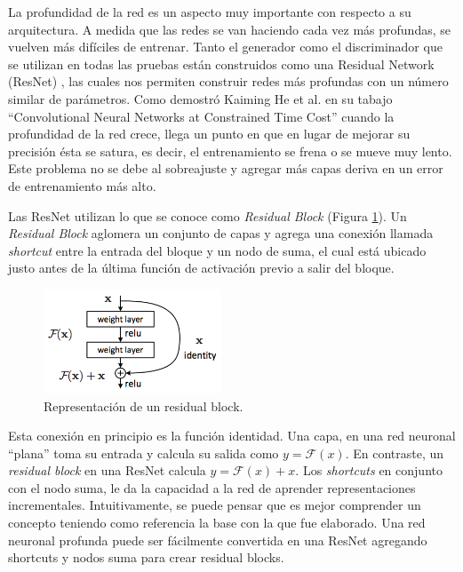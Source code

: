 \documentclass[spanish]{report}
\begin{document}
La profundidad de la red es un aspecto muy importante con respecto a su arquitectura. A medida que las redes se van haciendo cada vez más profundas, se vuelven más difíciles de entrenar. Tanto el generador como el discriminador que se utilizan en todas las pruebas están construidos como una Residual Network (ResNet) \cite{resnet_paper} \cite{resnet_1}, las cuales nos permiten construir redes más profundas con un número similar de parámetros. 
\newpage
Como demostró Kaiming He et al. en su tabajo ``Convolutional Neural Networks at Constrained Time Cost'' \cite{DBLP:journals/corr/He014} cuando la profundidad de la red crece, llega un punto en que en lugar de mejorar su precisión ésta se satura, es decir, el entrenamiento se frena o se mueve muy lento. Este problema no se debe al sobreajuste y agregar más capas deriva en un error de entrenamiento más alto.


Las ResNet utilizan lo que se conoce como \textit{Residual Block} (Figura  \ref{fig:residual_block}). Un \textit{Residual Block} aglomera un conjunto de capas y agrega una conexión llamada \textit{shortcut} entre la entrada del bloque y un nodo de suma, el cual está ubicado justo antes de la última función de activación previo a salir del bloque.

\begin{figure}[h]
\centering
 \includegraphics[width=200px]{resiudal_block.png}
   \caption[Representación de un residual block.]{Representación de un residual block. \protect\footnotemark}
  \label{fig:residual_block}
\end{figure}


\noindent Esta conexión en principio es la función identidad. Una capa, en una red neuronal ``plana'' toma su entrada y calcula su salida como $y = \mathcal{F}(x)$. En contraste, un \textit{residual block} en una ResNet calcula $y = \mathcal{F}(x) + x$. Los \textit{shortcuts} en conjunto con el nodo suma, le da la capacidad a la red de aprender representaciones incrementales. Intuitivamente, se puede pensar que es mejor comprender un concepto teniendo como referencia la base con la que fue elaborado. Una red neuronal profunda puede ser fácilmente convertida en una ResNet agregando shortcuts y nodos suma para crear residual blocks.
\end{document}
